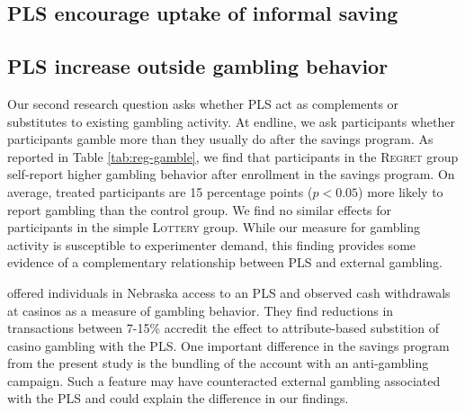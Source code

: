 \documentclass[11pt]{article}
\begin{document}



	\subsection{PLS encourage uptake of informal saving}


	\subsection{PLS increase outside gambling behavior}

		Our second research question asks whether PLS act as complements or substitutes to existing gambling activity. At endline, we ask participants whether participants gamble more than they usually do after the savings program. As reported in Table \ref{tab:reg-gamble}, we find that participants in the \textsc{Regret} group self-report higher gambling behavior after enrollment in the savings program. On average, treated participants are 15 percentage points ($p < 0.05$) more likely to report gambling than the control group. We find no similar effects for participants in the simple \textsc{Lottery} group. While our measure for gambling activity is susceptible to experimenter demand, this finding provides some evidence of a complementary relationship between PLS and external gambling.

		 offered individuals in Nebraska access to an PLS and observed cash withdrawals at casinos as a measure of gambling behavior. They find reductions in transactions between 7-15\% accredit the effect to attribute-based substition of casino gambling with the PLS. One important difference in the savings program from the present study is the bundling of the account with an anti-gambling campaign. Such a feature may have counteracted external gambling associated with the PLS and could explain the difference in our findings.
\end{document}
